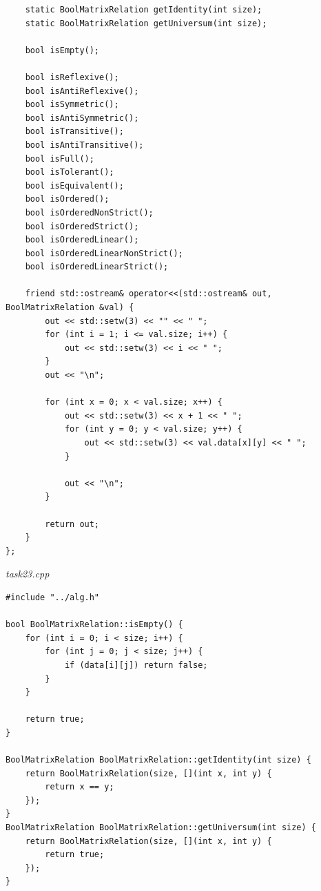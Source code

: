\documentclass[a4paper,14pt]{extarticle}
\begin{document}
\begin{enumerate}[label=2.\arabic*.]
\begin{verbatim}
	static BoolMatrixRelation getIdentity(int size);
	static BoolMatrixRelation getUniversum(int size);
	
	bool isEmpty();
	
	bool isReflexive();
	bool isAntiReflexive();
	bool isSymmetric();
	bool isAntiSymmetric();
	bool isTransitive();
	bool isAntiTransitive();
	bool isFull();
	bool isTolerant();
	bool isEquivalent();
	bool isOrdered();
	bool isOrderedNonStrict();
	bool isOrderedStrict();
	bool isOrderedLinear();
	bool isOrderedLinearNonStrict();
	bool isOrderedLinearStrict();
	
	friend std::ostream& operator<<(std::ostream& out, BoolMatrixRelation &val) {
		out << std::setw(3) << "" << " ";
		for (int i = 1; i <= val.size; i++) {
			out << std::setw(3) << i << " ";
		}
		out << "\n";
		
		for (int x = 0; x < val.size; x++) {
			out << std::setw(3) << x + 1 << " ";
			for (int y = 0; y < val.size; y++) {
				out << std::setw(3) << val.data[x][y] << " ";
			}
			
			out << "\n";
		}
		
		return out;
	}
};
    	\end{verbatim}
    	\textit{task23.cpp} 
    	\begin{verbatim}
#include "../alg.h"

bool BoolMatrixRelation::isEmpty() {
	for (int i = 0; i < size; i++) {
		for (int j = 0; j < size; j++) {
			if (data[i][j]) return false;
		}
	}
	
	return true;
}

BoolMatrixRelation BoolMatrixRelation::getIdentity(int size) {
	return BoolMatrixRelation(size, [](int x, int y) {
		return x == y;
	});
}
BoolMatrixRelation BoolMatrixRelation::getUniversum(int size) {
	return BoolMatrixRelation(size, [](int x, int y) {
		return true;
	});
}


\end{verbatim}
\end{enumerate}
\end{document}
